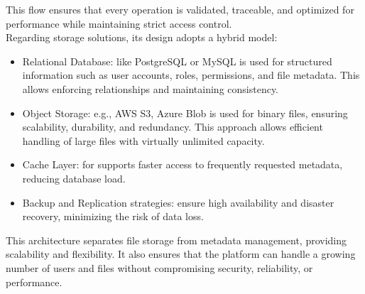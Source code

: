 This flow ensures that every operation is validated, traceable, and optimized for performance while maintaining strict access control. \\

Regarding storage solutions, its design adopts a hybrid model:

\begin{itemize}
    \item Relational Database: like PostgreSQL or MySQL is used for structured information such as user accounts, roles, permissions, and file metadata. This allows enforcing relationships and maintaining consistency.
    \item Object Storage: e.g., AWS S3, Azure Blob is used for binary files, ensuring scalability, durability, and redundancy. This approach allows efficient handling of large files with virtually unlimited capacity.
    \item Cache Layer: for supports faster access to frequently requested metadata, reducing database load.
    \item Backup and Replication strategies: ensure high availability and disaster recovery, minimizing the risk of data loss.
\end{itemize}

This architecture separates file storage from metadata management, providing scalability and flexibility. It also ensures that the platform can handle a growing number of users and files without compromising security, reliability, or performance.
